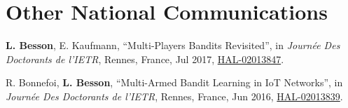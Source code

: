 \section*{Other National Communications}
\renewcommand{\labelenumi}{[ONC-\arabic{enumi}]}
\begin{etaremune}
	\item \textbf{L. Besson}, E. Kaufmann, ``Multi-Players Bandits Revisited'', in \emph{Journ\'{e}e Des Doctorants de l'IETR}, Rennes, France, Jul 2017, \href{https://hal.inria.fr/hal-02013847}{HAL-02013847}.
	\item	R. Bonnefoi, \textbf{L. Besson}, ``Multi-Armed Bandit Learning in IoT Networks'', in \emph{Journ\'{e}e Des Doctorants de l'IETR}, Rennes, France, Jun 2016, \href{https://hal.inria.fr/hal-02013839}{HAL-02013839}.
\end{etaremune}


